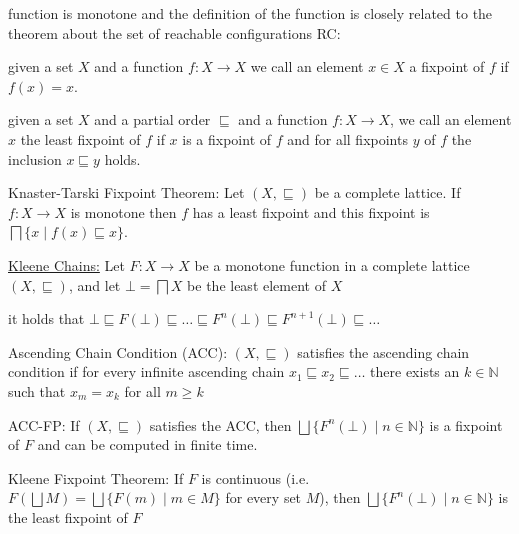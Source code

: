 \documentclass[landscape, a4paper]{article}
\begin{document}
\begin{minipage}[t]{0.2\linewidth}
\begin{betterlist}
\begin{betterlist}
			\item function is monotone and the definition of the function is closely related to the theorem about the set of reachable configurations RC: 
		\end{betterlist}
		\item given a set $X$ and a function $f:X \rightarrow X$ we call an element $x \in X$ a \alert{fixpoint} of $f$ if $f(x) = x$. 
		\item given a set $X$ and a partial order $\sqsubseteq$ and a function $f:X \rightarrow X$, we call an element $x$ the \alert{least fixpoint} of $f$ if $x$ is a fixpoint of $f$ and for all fixpoints $y$ of $f$ the inclusion $x \sqsubseteq y$ holds. 
		\begin{betterlist}
			\item \color{orange}\alert{Knaster-Tarski Fixpoint Theorem}: Let $(X, \sqsubseteq)$ be a complete lattice. If $f:X \rightarrow X$ is monotone then $f$ has a least fixpoint and this fixpoint is $\bigsqcap \{x \mid f(x) \sqsubseteq x\}$. \color{black}
			\item {}
		\end{betterlist}
		\item \color{orange}\underline{Kleene Chains:} Let $F : X \rightarrow X$ be a monotone function in a complete lattice $(X, \sqsubseteq)$, and let $\bot = \bigsqcap X$ be the least element of $X$\color{black}
		\begin{betterlist}
			\item \color{orange}it holds that $\bot\sqsubseteq F(\bot) \sqsubseteq \ldots \sqsubseteq F^n(\bot) \sqsubseteq F^{n+1}(\bot) \sqsubseteq \ldots$\color{black}
			\item \color{orange}\alert{Ascending Chain Condition (ACC)}: $(X, \sqsubseteq)$ satisfies the \alert{ascending chain condition} if for every infinite ascending chain $x_1 \sqsubseteq x_2 \sqsubseteq \ldots$ there exists an $k \in \mathbb{N}$ such that $x_m = x_k$ for all $m \ge k$\color{black}
			\item \color{orange}\alert{ACC-FP}: If $(X, \sqsubseteq)$ satisfies the ACC, then $\bigsqcup\{F^n(\bot) \mid n \in  \mathbb{N}\}$ is a fixpoint of $F$ and can be computed in finite time. \color{black}
			\item \color{orange}\alert{Kleene Fixpoint Theorem}: If $F$ is continuous (i.e. $F(\bigsqcup M) = \bigsqcup \{F(m) \mid m \in M\}$ for every set $M$), then $\bigsqcup\{F^n(\bot) \mid n \in \mathbb{N}\}$ is the least fixpoint of $F$\color{black}

\end{betterlist}
\end{betterlist}
\end{minipage}
\end{document}
